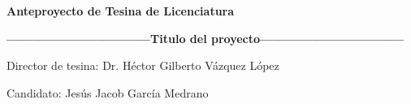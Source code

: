 \begin{center}
	\textbf{Anteproyecto de Tesina de Licenciatura}
	
	\vspace{.7cm}
	\textbf{---------------------------------Titulo del proyecto---------------------------------}
	\vspace{.7cm}

\end{center}

Director de tesina: Dr. Héctor Gilberto Vázquez López 

Candidato: Jesús Jacob García Medrano



